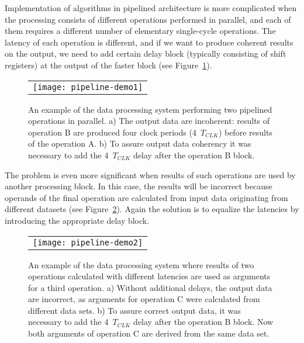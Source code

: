 \documentclass[preprint,11pt]{elsarticle}
\begin{document}
 Implementation of algorithms in pipelined architecture is more complicated when    
 the processing consists of different operations performed in parallel,
 and each of them requires a different number of elementary
 single-cycle operations. 
 The latency of each operation is different, and if we want to produce coherent results 
 on the output, we need to add certain delay block (typically consisting of shift registers)
 at the output of the faster block (see Figure~\ref{fig:pipeline-demo1}).
 
 \begin{figure}[t]
 {   
 \begin{center}
    \begin{tabular}{c}
    \texttt{[image: pipeline-demo1]}
    \end{tabular}
    \end{center}
    \caption
    { \label{fig:pipeline-demo1}
     An example of the data processing system performing two pipelined operations
     in parallel.
     a) The output data are incoherent: results of operation B are produced four clock
     periods (4~$T_{CLK}$) before results of the operation A.
     b) To assure output data coherency it was necessary to add the 4~$T_{CLK}$ delay 
     after the operation B block.
    }
 }
 \end{figure}
 The problem is even more significant when results of such operations are used by another
 processing block. In this case, the results will be incorrect because operands 
 of the final operation are calculated from input data originating from
 different datasets (see Figure~\ref{fig:pipeline-demo2}).
 Again the solution is to equalize the latencies by introducing the appropriate delay block.
 \begin{figure}[t]
 {   
 \begin{center}
    \begin{tabular}{c}
    \texttt{[image: pipeline-demo2]}
    \end{tabular}
    \end{center}
    \caption
    { \label{fig:pipeline-demo2}
     An example of the data processing system where results of two operations calculated with 
     different latencies are used as arguments for a third operation.
     a) Without additional delays, the output data are incorrect, as arguments for operation C were calculated from different data sets.
     b) To assure correct output data, it was necessary to add the 4~$T_{CLK}$ delay 
     after the operation B block. Now both arguments of operation C are derived from the same
     data set.
    }
 }
 \end{figure}
\end{document}
